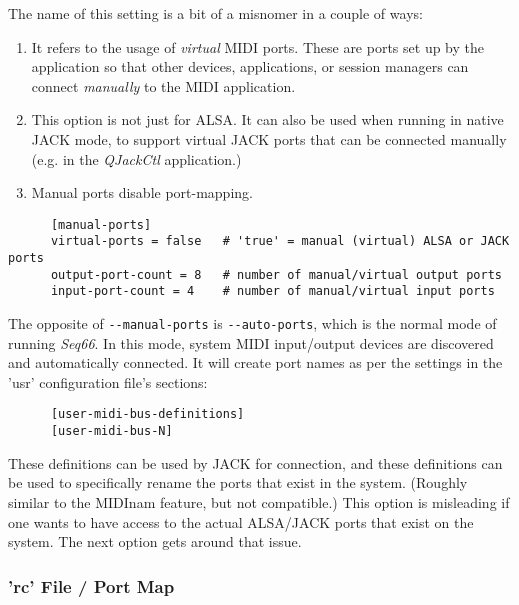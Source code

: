    The name of this setting is a bit of a misnomer in a couple of ways:

   \begin{enumerate}
      \item It refers to the usage of \textsl{virtual} MIDI ports.
         These are ports set up by the application so that other
         devices, applications, or session managers can connect
         \textsl{manually} to the MIDI application.
      \item This option is not just for ALSA.  It can also be used when
         running in native JACK mode, to support
         virtual JACK ports that can be connected manually (e.g. in the
         \textsl{QJackCtl} application.)
      \item Manual ports disable port-mapping.
   \end{enumerate}

   \begin{verbatim}
      [manual-ports]
      virtual-ports = false   # 'true' = manual (virtual) ALSA or JACK ports
      output-port-count = 8   # number of manual/virtual output ports
      input-port-count = 4    # number of manual/virtual input ports
   \end{verbatim}

   The opposite of \texttt{-{}-manual-ports} is \texttt{-{}-auto-ports},
   which is the normal mode of running \textsl{Seq66}.
   In this mode, system MIDI input/output devices are discovered and
   automatically connected.
   It will create port names as per the settings in the 'usr' configuration
   file's sections:

   \begin{verbatim}
      [user-midi-bus-definitions]
      [user-midi-bus-N]
   \end{verbatim}

   These definitions can be used by JACK for connection, and these
   definitions can be used to specifically rename the ports that exist in the
   system. (Roughly similar to the MIDInam feature, but not compatible.)
   This option is misleading if one wants to have access to the
   actual ALSA/JACK ports that exist on the system.
   The next option gets around that issue.

\subsubsection{'rc' File / Port Map}
\label{subsubsec:configuration_rc_port_map}

